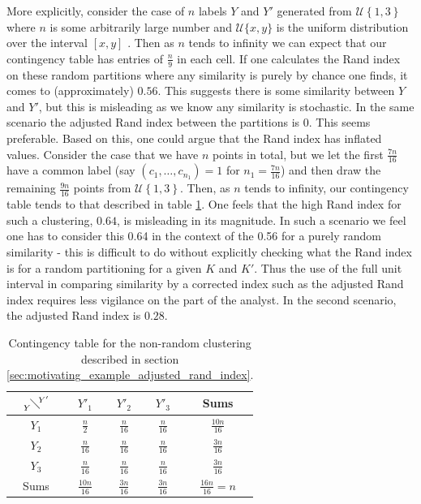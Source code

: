 \documentclass[14pt]{extarticle} %
\begin{document}
More explicitly, consider the case of $n$ labels $Y$ and $Y'$ generated from $\mathcal{U}\left\{1,3\right\}$ where $n$ is some arbitrarily large number and $\mathcal{U}\{x,y\}$ is the uniform distribution over the interval $[x,y]$ . Then as $n$ tends to infinity we can expect that our contingency table has entries of $\frac{n}{9}$ in each cell. If one calculates the Rand index on these random partitions where any similarity is purely by chance one finds, it comes to (approximately) $0.56$. This suggests there is some similarity between $Y$ and $Y'$, but this is misleading as we know any similarity is stochastic. In the same scenario the adjusted Rand index between the partitions is 0. This seems preferable. Based on this, one could argue that the Rand index has inflated values. Consider the case that we have $n$ points in total, but we let the first $\frac{7n}{16}$ have a common label (say $\left(c_1,\ldots,c_{n_1}\right)=1$ for $n_1 = \frac{7n}{16}$) and then draw the remaining $\frac{9n}{16}$ points from $\mathcal{U}\left\{1,3\right\}$. Then, as $n$ tends to infinity, our contingency table tends to that described in table \ref{table:rand_contingency_example}. One feels that the high Rand index for such a clustering, $0.64$, is misleading in its magnitude. In such a scenario we feel one has to consider this 0.64 in the context of the 0.56 for a purely random similarity - this is difficult to do without explicitly checking what the Rand index is for a random partitioning for a given $K$ and $K'$. Thus the use of the full unit interval in comparing similarity by a corrected index such as the adjusted Rand index requires less vigilance on the part of the analyst. In the second scenario, the adjusted Rand index is $0.28$.

\begin{table}[] 
	\centering
	\begin{tabular}{c|ccc|c} 
		$ {{} \atop Y}  \!\diagdown\! ^{Y'}$	& $Y'_1$	& $Y'_2$	& $Y'_3 $	& Sums	\\ 
		\hline
		$Y_1$		& $\frac{n}{2}$	& $\frac{n}{16}$ & $\frac{n}{16}$	& $\frac{10n}{16}$	\\
		$Y_2$		& $\frac{n}{16}$	& $\frac{n}{16}$	& $\frac{n}{16}$	& $\frac{3n}{16}$	\\
		$Y_3$	& $\frac{n}{16}$	& $\frac{n}{16}$	& $\frac{n}{16}$	& $\frac{3n}{16}$	\\ 
		\hline
		Sums	& $\frac{10n}{16}$	&  $\frac{3n}{16}$	& $\frac{3n}{16}$	& $\frac{16n}{16} = n$         
	\end{tabular}
	\caption{Contingency table for the non-random clustering described in section \ref{sec:motivating_example_adjusted_rand_index}.}
	\label{table:rand_contingency_example}
\end{table}
\end{document}
